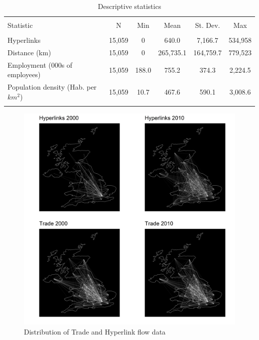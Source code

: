 \documentclass[]{interact}
\theoremstyle{plain}%
\theoremstyle{definition}
\theoremstyle{remark}
\begin{document}
\begin{table}[!htbp] \centering 
  \caption{Descriptive statistics\label{descr}} 
  \label{} 
\footnotesize 
\begin{tabular}{@{\extracolsep{1pt}}lccccc} 
\\[-1.8ex]\hline 
\hline \\[-1.8ex] 
Statistic & \multicolumn{1}{c}{N} & \multicolumn{1}{c}{Min} & \multicolumn{1}{c}{Mean} & \multicolumn{1}{c}{St. Dev.} & \multicolumn{1}{c}{Max} \\ 
\hline \\[-1.8ex] 
Hyperlinks & 15,059 & 0 & 640.0 & 7,166.7 & 534,958 \\ 
Distance (km) & 15,059 & 0 & 265,735.1 & 164,759.7 & 779,523 \\ 
Employment (000s of employees) & 15,059 & 188.0 & 755.2 & 374.3 & 2,224.5 \\ 
Population density (Hab. per $km^2$) & 15,059 & 10.7 & 467.6 & 590.1 & 3,008.6 \\ 
\hline \\[-1.8ex] 
\end{tabular} 
\end{table}

\begin{figure}[p]
\includegraphics[width=1\linewidth]{figures/flow_maps} \caption{\label{Flow_maps}Distribution of Trade and Hyperlink flow data}\label{fig:unnamed-chunk-2}
\end{figure}
\end{document}
